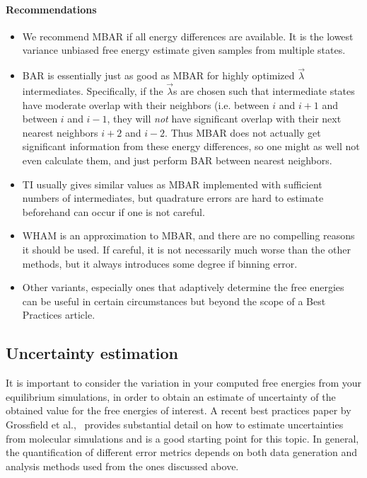 \documentclass[9pt,bestpractices]{livecoms}
\begin{document}
\paragraph{Recommendations}
\begin{itemize}
\item We recommend MBAR if all energy differences are available. It is the lowest variance unbiased free energy estimate given samples from multiple states.
\item BAR is essentially just as good as MBAR for highly optimized $\vec{\lambda}$ intermediates. Specifically, if the $\vec{\lambda}$s are chosen such that intermediate states have moderate overlap with their neighbors (i.e. between $i$ and $i+1$ and between $i$ and $i-1$, they will \textit{not} have significant overlap with their next nearest neighbors $i+2$ and $i-2$. Thus MBAR does not actually get significant information from these energy differences, so one might as well not even calculate them, and just perform BAR between nearest neighbors.~\cite{paliwal2011benchmark} 
\item TI usually gives similar values as MBAR implemented with sufficient numbers of intermediates, but quadrature errors are hard to estimate beforehand  can occur if one is not careful.~\cite{paliwal2011benchmark}
\item WHAM is an approximation to MBAR, and there are no compelling reasons it should be used. If careful, it is not necessarily much worse than the other methods, but it always introduces some degree if binning error.
\item Other variants, especially ones that adaptively determine the free energies can be useful in certain circumstances but beyond the scope of a Best Practices article.
\end{itemize}

\subsection{Uncertainty estimation}
\label{subsec:uncertainty}
It is important to consider the variation in your computed free energies from your equilibrium simulations, in order to obtain an estimate of uncertainty of the obtained value for the free energies of interest. A recent best practices paper by Grossfield et al.,~\cite{grossfield2018best} provides substantial detail on how to estimate uncertainties from molecular simulations and is a good starting point for this topic. 
In general, the quantification of different error metrics depends on both data generation and analysis methods used from the ones discussed above. 
\end{document}
